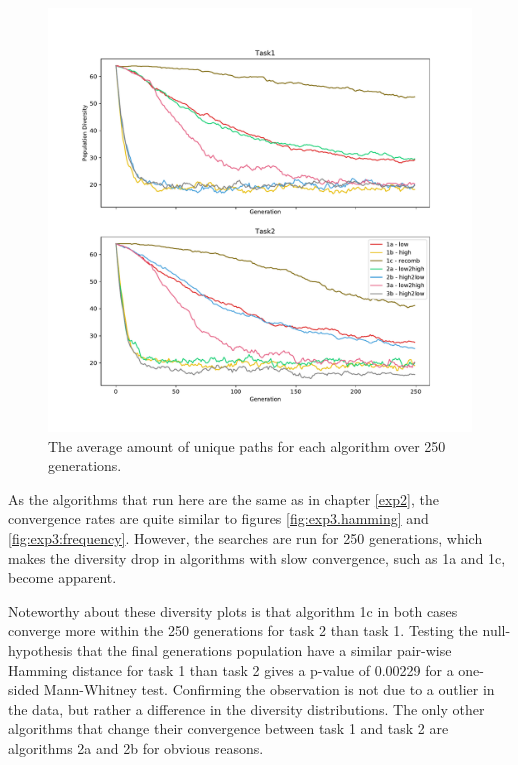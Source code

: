 \begin{figure}[h!]
    \includegraphics[width=\textwidth, center]{Chapters/4.Experiments/exp3/figures/diversity_frequency.pdf}
    \caption[Frequency diversity plot]{The average amount of unique paths for each algorithm over 250 generations.}
    \label{fig:exp3.frequency}
\end{figure}

As the algorithms that run here are the same as in chapter \ref{exp2}, the convergence rates are quite similar to figures \ref{fig:exp3.hamming} and \ref{fig:exp3:frequency}. However, the searches are run for 250 generations, which makes the diversity drop in algorithms with slow convergence, such as 1a and 1c, become apparent. 

Noteworthy about these diversity plots is that algorithm 1c in both cases converge more within the 250 generations for task 2 than task 1. Testing the null-hypothesis that the final generations population have a similar pair-wise Hamming distance for task 1 than task 2 gives a p-value of 0.00229 for a one-sided Mann-Whitney test. Confirming the observation is not due to a outlier in the data, but rather a difference in the diversity distributions. The only other algorithms that change their convergence between task 1 and task 2 are algorithms 2a and 2b for obvious reasons.  

